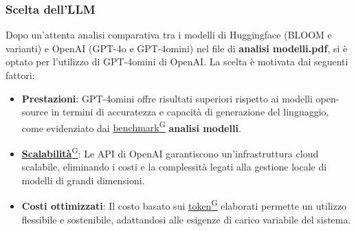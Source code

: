 \subsubsection{Scelta dell'LLM}
Dopo un'attenta analisi comparativa tra i modelli di Huggingface (BLOOM e varianti) e OpenAI (GPT-4o e GPT-4omini) nel file di \textbf{analisi modelli.pdf}, si è optato per l'utilizzo di GPT-4omini di OpenAI. La scelta è motivata dai seguenti fattori:
\begin{itemize}
    \item \textbf{Prestazioni}: GPT-4omini offre risultati superiori rispetto ai modelli open-source in termini di accuratezza e capacità di generazione del linguaggio, come evidenziato dai \href{https://code7crusaders.github.io/docs/RTB/documentazione_interna/glossario.html#benchmark}{benchmark\textsuperscript{G}} \textbf{analisi modelli}.
    \item \href{https://code7crusaders.github.io/docs/RTB/documentazione_interna/glossario.html#scalabilità}{\textbf{Scalabilità}\textsuperscript{G}}: Le API di OpenAI garantiscono un'infrastruttura cloud scalabile, eliminando i costi e la complessità legati alla gestione locale di modelli di grandi dimensioni.
    \item \textbf{Costi ottimizzati}: Il costo basato sui \href{https://code7crusaders.github.io/docs/RTB/documentazione_interna/glossario.html#token}{token\textsuperscript{G}} elaborati permette un utilizzo flessibile e sostenibile, adattandosi alle esigenze di carico variabile del sistema.
\end{itemize}

